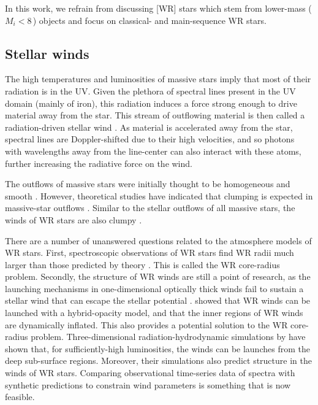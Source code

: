 In this work, we refrain from discussing [WR] stars which stem from lower-mass ($M_i < 8\,$\Msun{}) objects and focus on classical- and main-sequence WR stars.

\subsection{Stellar winds}

The high temperatures and luminosities of massive stars imply that most of their radiation is in the UV. Given the plethora of spectral lines present in the UV domain (mainly of iron), this radiation induces a force strong enough to drive material away from the star. This stream of outflowing material is then called a radiation-driven stellar wind \citep{1970LucySolomon,1975castor}. As material is accelerated away from the star, spectral lines are Doppler-shifted due to their high velocities, and so photons with wavelengths away from the line-center can also interact with these atoms, further increasing the radiative force on the wind. 

The outflows of massive stars were initially thought to be homogeneous and smooth \citep{1988deJager,1990Nieuwenhuijzen}. However, theoretical studies have indicated that clumping is expected in massive-star outflows \citep{1988Owocki,2005DessartOwocki,2013SundqvistOwocki,2018Sundqvist,2019A&A...631A.172D}. Similar to the stellar outflows of all massive stars, the winds of WR stars are also clumpy \citep{1991Hillier_clumping_escattering,1998Hamann_clumping,puls_bright_2006,fullerton_discordance_2006}. 

There are a number of unanswered questions related to the atmosphere models of WR stars. First, spectroscopic observations of WR stars find WR radii much larger than those predicted by theory \citep{2007Crowther,hamann_galactic_2019,sander_galactic_2019}. This is called the WR core-radius problem. Secondly, the structure of WR winds are still a point of research, as the launching mechanisms in one-dimensional optically thick winds fail to sustain a stellar wind that can escape the stellar potential \citep[e.g.][]{2016Ro_WR_winds,2017Sander_WR_winds}. \citet{2021Poniatowski} showed that WR winds can be launched with a hybrid-opacity model, and that the inner regions of WR winds are dynamically inflated. This also provides a potential solution to the WR core-radius problem. Three-dimensional radiation-hydrodynamic simulations by \citet{2022Moens} have shown that, for sufficiently-high luminosities, the winds can be launches from the deep sub-surface regions. Moreover, their simulations also predict structure in the winds of WR stars. Comparing observational time-series data of spectra \citep[e.g.][]{lepine_wind_2000} with synthetic predictions to constrain wind parameters is something that is now feasible.

